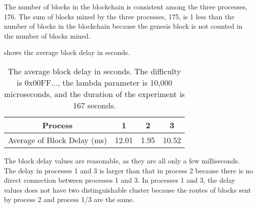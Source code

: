 \documentclass[11pt]{article}
\begin{document}
The number of blocks in the blockchain is consistent among the three processes, 176. The sum of blocks mined by the three processes, 175, is 1 less than the number of blocks in the blockchain because the genesis block is not counted in the number of blocks mined.



 shows the average block delay in seconds.

\begin{table}[hb]
    \centering
    \begin{tabular}{|c|c|c|c|}
        \hline
        Process & 1 & 2 & 3 \\
        \hline
        Average of Block Delay (ms) & 12.01 & 1.95 & 10.52 \\
        \hline
    \end{tabular}
    \caption{The average block delay in seconds. The difficulty is 0x00FF..., the lambda parameter is 10,000 microseconds, and the duration of the experiment is 167 seconds.}
    \label{tab:delay}
\end{table}


The block delay values are reasonable, as they are all only a few milliseconds. The delay in processes 1 and 3 is larger than that in process 2 because there is no direct connection between processes 1 and 3. In processes 1 and 3, the delay values does not have two distinguishable cluster because the routes of blocks sent by process 2 and process 1/3 are the same.
\end{document}

